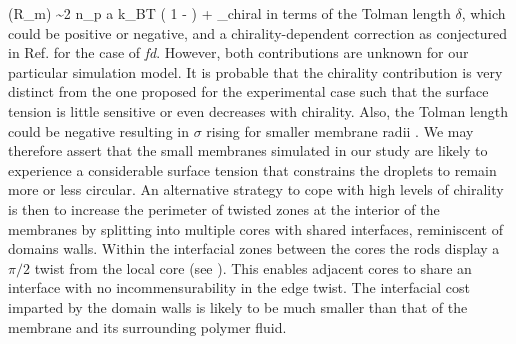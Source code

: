 \beq
\sigma(R_{m}) \sim 2 n_{p} a k_{B}T \left ( 1 -  \right ) + \sigma_{\rm chiral}  
\eeq
in terms of the Tolman length $\delta$, which could be positive or negative, and a chirality-dependent correction as conjectured in Ref. \cite{Gibaud2012} for the case of {\em fd}. However, both contributions are unknown for our particular simulation model. It is probable that the chirality contribution is very distinct from the one proposed for the experimental case such that the surface tension is little sensitive or even  decreases with  chirality.  Also, the Tolman length could be negative resulting in $\sigma$ rising  for smaller membrane radii \cite{lei2005tolman,malijevsky2012perspective}.   We may therefore assert that the  small membranes simulated in our study are likely to experience a considerable surface tension that constrains the droplets to remain more or less circular. An alternative strategy to cope with high levels of chirality is then to increase the perimeter of twisted zones at the interior of the membranes by splitting into multiple cores with shared interfaces, reminiscent of domains walls.  Within the interfacial zones between the cores the rods display a $\pi/2$ twist from the local core (see ). This enables adjacent cores to share an interface with no incommensurability in the edge twist. The interfacial cost imparted by  the domain walls is likely to be much smaller than that of the membrane and its surrounding polymer fluid.  


